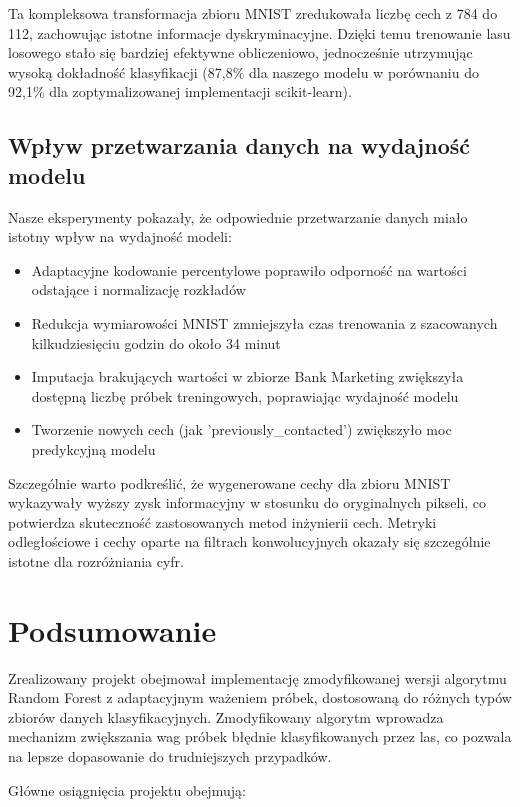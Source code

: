 \documentclass[11pt,a4paper]{article}
\begin{document}
Ta kompleksowa transformacja zbioru MNIST zredukowała liczbę cech z 784 do 112, zachowując istotne informacje dyskryminacyjne. Dzięki temu trenowanie lasu losowego stało się bardziej efektywne obliczeniowo, jednocześnie utrzymując wysoką dokładność klasyfikacji (87,8\% dla naszego modelu w porównaniu do 92,1\% dla zoptymalizowanej implementacji scikit-learn).

\subsection{Wpływ przetwarzania danych na wydajność modelu}

Nasze eksperymenty pokazały, że odpowiednie przetwarzanie danych miało istotny wpływ na wydajność modeli:

\begin{itemize}
    \item Adaptacyjne kodowanie percentylowe poprawiło odporność na wartości odstające i normalizację rozkładów
    \item Redukcja wymiarowości MNIST zmniejszyła czas trenowania z szacowanych kilkudziesięciu godzin do około 34 minut
    \item Imputacja brakujących wartości w zbiorze Bank Marketing zwiększyła dostępną liczbę próbek treningowych, poprawiając wydajność modelu
    \item Tworzenie nowych cech (jak 'previously\_contacted') zwiększyło moc predykcyjną modelu
\end{itemize}

Szczególnie warto podkreślić, że wygenerowane cechy dla zbioru MNIST wykazywały wyższy zysk informacyjny w stosunku do oryginalnych pikseli, co potwierdza skuteczność zastosowanych metod inżynierii cech. Metryki odległościowe i cechy oparte na filtrach konwolucyjnych okazały się szczególnie istotne dla rozróżniania cyfr.

\section{Podsumowanie}

Zrealizowany projekt obejmował implementację zmodyfikowanej wersji algorytmu Random Forest z adaptacyjnym ważeniem próbek, dostosowaną do różnych typów zbiorów danych klasyfikacyjnych. Zmodyfikowany algorytm wprowadza mechanizm zwiększania wag próbek błędnie klasyfikowanych przez las, co pozwala na lepsze dopasowanie do trudniejszych przypadków.

Główne osiągnięcia projektu obejmują:
\end{document}
